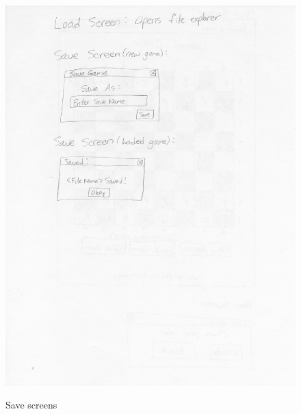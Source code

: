 \documentclass{article}
\begin{document}
	\begin{figure}[H]
		\caption{Save screens}
		\includegraphics[width=\linewidth]{PaperProtoTypePart2.jpg}
		\label{fig:prototype2}
	\end{figure}
\end{document}
